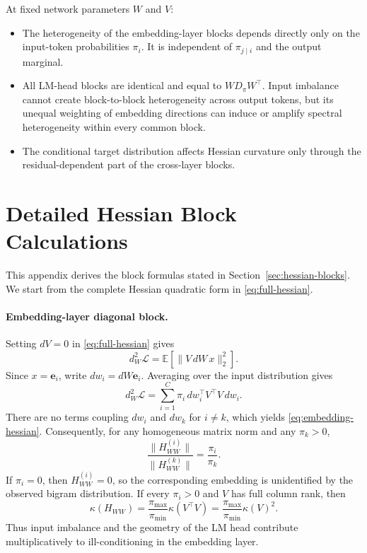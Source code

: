 \documentclass[11pt]{article}
\newcommand{\E}{\mathbb{E}}
\begin{document}
\begin{hessianhighlight}
At fixed network parameters \(W\) and \(V\):
\begin{itemize}
  \item The heterogeneity of the embedding-layer blocks depends directly
  only on the input-token probabilities \(\pi_i\).  It is independent of
  \(\pi_{j\mid i}\) and the output marginal.
  \item All LM-head blocks are identical and equal to \(WD_\pi W^\top\).
  Input imbalance cannot create block-to-block heterogeneity across output
  tokens, but its unequal weighting of embedding directions can induce or
  amplify spectral heterogeneity within every common block.
  \item The conditional target distribution affects Hessian curvature only
  through the residual-dependent part of the cross-layer blocks.
\end{itemize}
\end{hessianhighlight}

\newpage
\appendix
\section{Detailed Hessian Block Calculations}
\label{app:hessian-calculations}

This appendix derives the block formulas stated in
Section~\ref{sec:hessian-blocks}.  We start from the complete Hessian
quadratic form in \eqref{eq:full-hessian}.

\paragraph{Embedding-layer diagonal block.}
Setting \(dV=0\) in \eqref{eq:full-hessian} gives
\begin{equation*}
d_W^2\mathcal{L}
=\E\!\left[\|V\,dW\,x\|_2^2\right].
\end{equation*}
Since \(x=\bm{e}_i\), write \(dw_i=dW\bm{e}_i\).  Averaging over the input
distribution gives
\begin{equation*}
d_W^2\mathcal{L}
=\sum_{i=1}^C
\pi_i\,dw_i^\top V^\top V\,dw_i.
\end{equation*}
There are no terms coupling \(dw_i\) and \(dw_k\) for \(i\neq k\), which
yields \eqref{eq:embedding-hessian}.  Consequently, for any homogeneous
matrix norm and any \(\pi_k>0\),
\begin{equation*}
\frac{\|H_{WW}^{(i)}\|}{\|H_{WW}^{(k)}\|}
=\frac{\pi_i}{\pi_k}.
\end{equation*}
If \(\pi_i=0\), then \(H_{WW}^{(i)}=0\), so the corresponding embedding is
unidentified by the observed bigram distribution.  If every \(\pi_i>0\) and
\(V\) has full column rank, then
\begin{equation*}
\kappa(H_{WW})
=\frac{\pi_{\max}}{\pi_{\min}}\kappa(V^\top V)
=\frac{\pi_{\max}}{\pi_{\min}}\kappa(V)^2.
\end{equation*}
Thus input imbalance and the geometry of the LM head contribute
multiplicatively to ill-conditioning in the embedding layer.
\end{document}
